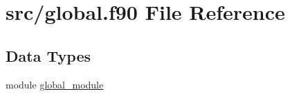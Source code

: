\hypertarget{global_8f90}{\section{src/global.f90 File Reference}
\label{global_8f90}
}
\subsection*{Data Types}
\begin{DoxyCompactItemize}
\item 
module \hyperlink{classglobal__module}{global\-\_\-module}
\end{DoxyCompactItemize}
